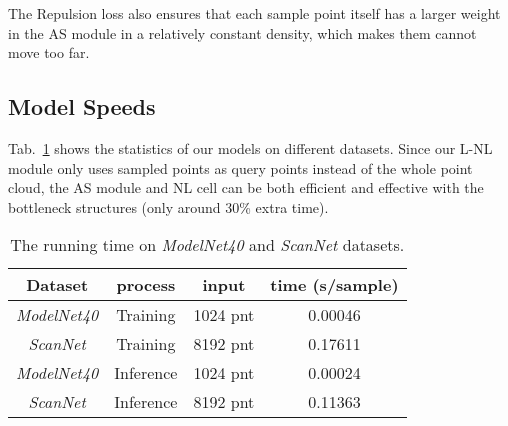 \documentclass[10pt,twocolumn,letterpaper]{article}
\begin{document}
	The Repulsion loss also ensures that each sample point itself has a larger weight in the AS module in a relatively constant density, which makes them cannot move too far.
	
	\subsection{Model Speeds}
	Tab.~\ref{speed} shows the statistics of our models on different datasets. Since our L-NL module only uses sampled points as query points instead of the whole point cloud, the AS module and NL cell can be both efficient and effective with the bottleneck structures (only around 30\% extra time).

		\begin{table}[b]
			\small
			\renewcommand\tabcolsep{5.5pt} 
			\begin{center}
				\caption{The running time on \textit{ModelNet40} and \textit{ScanNet} datasets.}
				\vspace{0.1cm}
				\begin{tabular}{c|ccc}
					\hline
					Dataset& process&input & time (s/sample) \\
					\hline
					\hline 
	
					\textit{ModelNet40}&Training&1024 pnt& 0.00046 \\	
					\textit{ScanNet}&Training& 8192 pnt&0.17611 \\\hline 
	
					\textit{ModelNet40}&Inference& 1024 pnt& 0.00024 \\	
					\textit{ScanNet}&Inference&8192 pnt& 0.11363 \\	
					\hline
				\end{tabular}
				\label{speed}
			\end{center}
			\vspace{-0.5cm}
	\end{table}
	
\end{document}
